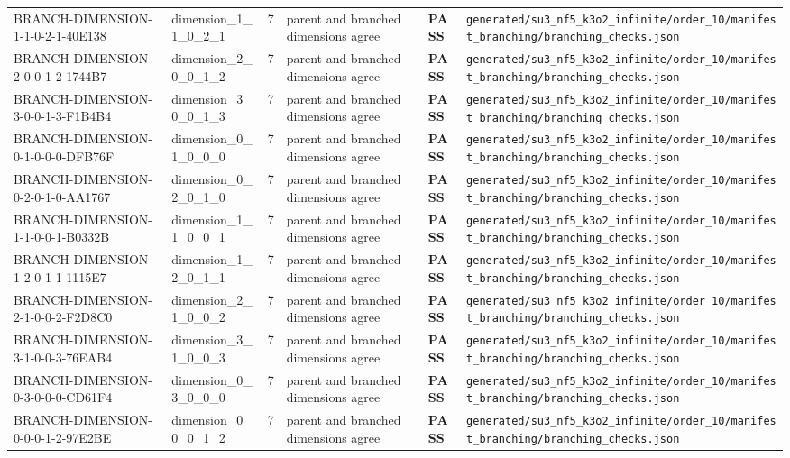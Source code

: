 \documentclass[11pt]{article}
\newcommand{\Pass}{\textcolor{green!50!black}{\textbf{PASS}}}
\newcommand{\RawPath}[1]{\texttt{#1}}
\begin{document}
\begin{longtable}{p{3cm}p{2.5cm}r p{3cm}l p{2cm}}
BRANCH-DIMENSION-1-1-0-2-1-40E138 & dimension\_1\_1\_0\_2\_1 & 7 & parent and branched dimensions agree & \Pass & \RawPath{generated/su3\_nf5\_k3o2\_infinite/order\_10/manifest\_branching/branching\_checks.json}\\
BRANCH-DIMENSION-2-0-0-1-2-1744B7 & dimension\_2\_0\_0\_1\_2 & 7 & parent and branched dimensions agree & \Pass & \RawPath{generated/su3\_nf5\_k3o2\_infinite/order\_10/manifest\_branching/branching\_checks.json}\\
BRANCH-DIMENSION-3-0-0-1-3-F1B4B4 & dimension\_3\_0\_0\_1\_3 & 7 & parent and branched dimensions agree & \Pass & \RawPath{generated/su3\_nf5\_k3o2\_infinite/order\_10/manifest\_branching/branching\_checks.json}\\
BRANCH-DIMENSION-0-1-0-0-0-DFB76F & dimension\_0\_1\_0\_0\_0 & 7 & parent and branched dimensions agree & \Pass & \RawPath{generated/su3\_nf5\_k3o2\_infinite/order\_10/manifest\_branching/branching\_checks.json}\\
BRANCH-DIMENSION-0-2-0-1-0-AA1767 & dimension\_0\_2\_0\_1\_0 & 7 & parent and branched dimensions agree & \Pass & \RawPath{generated/su3\_nf5\_k3o2\_infinite/order\_10/manifest\_branching/branching\_checks.json}\\
BRANCH-DIMENSION-1-1-0-0-1-B0332B & dimension\_1\_1\_0\_0\_1 & 7 & parent and branched dimensions agree & \Pass & \RawPath{generated/su3\_nf5\_k3o2\_infinite/order\_10/manifest\_branching/branching\_checks.json}\\
BRANCH-DIMENSION-1-2-0-1-1-1115E7 & dimension\_1\_2\_0\_1\_1 & 7 & parent and branched dimensions agree & \Pass & \RawPath{generated/su3\_nf5\_k3o2\_infinite/order\_10/manifest\_branching/branching\_checks.json}\\
BRANCH-DIMENSION-2-1-0-0-2-F2D8C0 & dimension\_2\_1\_0\_0\_2 & 7 & parent and branched dimensions agree & \Pass & \RawPath{generated/su3\_nf5\_k3o2\_infinite/order\_10/manifest\_branching/branching\_checks.json}\\
BRANCH-DIMENSION-3-1-0-0-3-76EAB4 & dimension\_3\_1\_0\_0\_3 & 7 & parent and branched dimensions agree & \Pass & \RawPath{generated/su3\_nf5\_k3o2\_infinite/order\_10/manifest\_branching/branching\_checks.json}\\
BRANCH-DIMENSION-0-3-0-0-0-CD61F4 & dimension\_0\_3\_0\_0\_0 & 7 & parent and branched dimensions agree & \Pass & \RawPath{generated/su3\_nf5\_k3o2\_infinite/order\_10/manifest\_branching/branching\_checks.json}\\
BRANCH-DIMENSION-0-0-0-1-2-97E2BE & dimension\_0\_0\_0\_1\_2 & 7 & parent and branched dimensions agree & \Pass & \RawPath{generated/su3\_nf5\_k3o2\_infinite/order\_10/manifest\_branching/branching\_checks.json}\\

\end{longtable}
\end{document}
